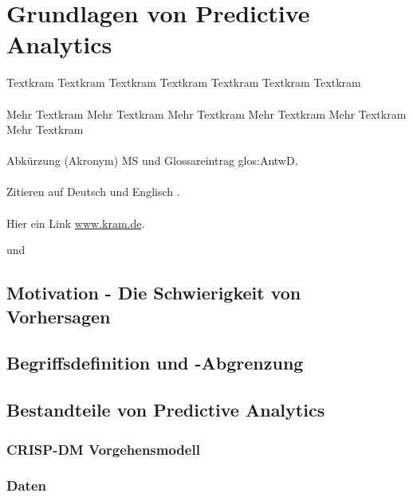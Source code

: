 \documentclass[12pt,a4paper,listof=totoc,oneside]{scrreprt}
\begin{document}










\tableofcontents
\setcounter{page}{1}

\chapter{Grundlagen von Predictive Analytics}

Textkram Textkram Textkram Textkram Textkram Textkram Textkram \\ \\
Mehr Textkram Mehr Textkram Mehr Textkram Mehr Textkram Mehr Textkram Mehr
Textkram \\ \\
Abkürzung (Akronym) \gls{MS} und Glossareintrag \gls{glos:AntwD}. \\ \\
Zitieren auf Deutsch \cite{ART12d} und Englisch \cite{ART12e}. \\ \\
Hier ein Link \url{www.kram.de}.

\cite{Thapa_Parycek} und \cite{Mergel}

\section{Motivation - Die Schwierigkeit von Vorhersagen}

\section{Begriffsdefinition und -Abgrenzung}

\section{Bestandteile von Predictive Analytics}

\subsection{CRISP-DM Vorgehensmodell}

\subsection{Daten}
\end{document}
